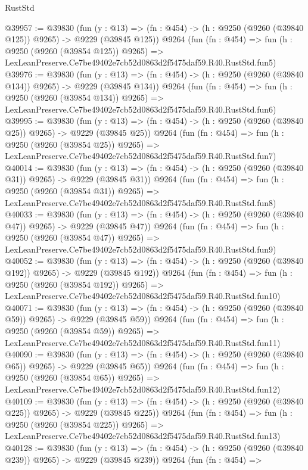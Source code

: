 \begin{lexlean}{RustStd}
\begin{coremodule}
@39957 := @39830
    (fun (y : @13) => (fn : @454) -> (h : @9250 (@9260 (@39840 @125)) @9265) -> @9229 (@39845 @125))
    @9264
    (fun (fn : @454) =>
    fun (h : @9250 (@9260 (@39854 @125)) @9265) =>
    LexLeanPreserve.Ce7be49402e7cb52d0863d2f5475daf59.R40.RustStd.fun5)
@39976 := @39830
    (fun (y : @13) => (fn : @454) -> (h : @9250 (@9260 (@39840 @134)) @9265) -> @9229 (@39845 @134))
    @9264
    (fun (fn : @454) =>
    fun (h : @9250 (@9260 (@39854 @134)) @9265) =>
    LexLeanPreserve.Ce7be49402e7cb52d0863d2f5475daf59.R40.RustStd.fun6)
@39995 := @39830
    (fun (y : @13) => (fn : @454) -> (h : @9250 (@9260 (@39840 @25)) @9265) -> @9229 (@39845 @25))
    @9264
    (fun (fn : @454) =>
    fun (h : @9250 (@9260 (@39854 @25)) @9265) =>
    LexLeanPreserve.Ce7be49402e7cb52d0863d2f5475daf59.R40.RustStd.fun7)
@40014 := @39830
    (fun (y : @13) => (fn : @454) -> (h : @9250 (@9260 (@39840 @31)) @9265) -> @9229 (@39845 @31))
    @9264
    (fun (fn : @454) =>
    fun (h : @9250 (@9260 (@39854 @31)) @9265) =>
    LexLeanPreserve.Ce7be49402e7cb52d0863d2f5475daf59.R40.RustStd.fun8)
@40033 := @39830
    (fun (y : @13) => (fn : @454) -> (h : @9250 (@9260 (@39840 @47)) @9265) -> @9229 (@39845 @47))
    @9264
    (fun (fn : @454) =>
    fun (h : @9250 (@9260 (@39854 @47)) @9265) =>
    LexLeanPreserve.Ce7be49402e7cb52d0863d2f5475daf59.R40.RustStd.fun9)
@40052 := @39830
    (fun (y : @13) => (fn : @454) -> (h : @9250 (@9260 (@39840 @192)) @9265) -> @9229 (@39845 @192))
    @9264
    (fun (fn : @454) =>
    fun (h : @9250 (@9260 (@39854 @192)) @9265) =>
    LexLeanPreserve.Ce7be49402e7cb52d0863d2f5475daf59.R40.RustStd.fun10)
@40071 := @39830
    (fun (y : @13) => (fn : @454) -> (h : @9250 (@9260 (@39840 @59)) @9265) -> @9229 (@39845 @59))
    @9264
    (fun (fn : @454) =>
    fun (h : @9250 (@9260 (@39854 @59)) @9265) =>
    LexLeanPreserve.Ce7be49402e7cb52d0863d2f5475daf59.R40.RustStd.fun11)
@40090 := @39830
    (fun (y : @13) => (fn : @454) -> (h : @9250 (@9260 (@39840 @65)) @9265) -> @9229 (@39845 @65))
    @9264
    (fun (fn : @454) =>
    fun (h : @9250 (@9260 (@39854 @65)) @9265) =>
    LexLeanPreserve.Ce7be49402e7cb52d0863d2f5475daf59.R40.RustStd.fun12)
@40109 := @39830
    (fun (y : @13) => (fn : @454) -> (h : @9250 (@9260 (@39840 @225)) @9265) -> @9229 (@39845 @225))
    @9264
    (fun (fn : @454) =>
    fun (h : @9250 (@9260 (@39854 @225)) @9265) =>
    LexLeanPreserve.Ce7be49402e7cb52d0863d2f5475daf59.R40.RustStd.fun13)
@40128 := @39830
    (fun (y : @13) => (fn : @454) -> (h : @9250 (@9260 (@39840 @239)) @9265) -> @9229 (@39845 @239))
    @9264
    (fun (fn : @454) =>

\end{coremodule}
\end{lexlean}
